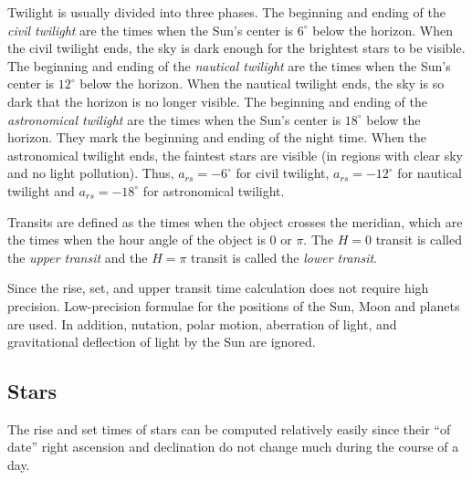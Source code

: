 \documentclass[12pt]{article}
\begin{document}
Twilight is usually divided into three phases. The beginning and ending 
of the {\em civil twilight} are the times when the Sun's center is $6^\circ$ below 
the horizon. When the civil twilight ends, the sky is dark enough for the 
brightest stars to be visible. The beginning and ending of the {\em nautical 
twilight} are the times when the Sun's center is $12^\circ$ below the horizon. When the 
nautical twilight ends, the sky is so dark that the horizon is no longer visible. 
The beginning and ending of the {\em astronomical twilight} are the times when 
the Sun's center is $18^\circ$ below the horizon. They mark the beginning and ending 
of the night time. When the astronomical twilight ends, the faintest stars 
are visible (in regions with clear sky and no light pollution). Thus, $a_{rs}=-6^\circ$ 
for civil twilight, $a_{rs}=-12^\circ$ for nautical twilight and 
$a_{rs}=-18^\circ$ for astronomical twilight.

Transits are defined as the times when the object crosses the meridian, which are 
the times when the hour angle of the object is 0 or $\pi$. The $H=0$ transit 
is called the {\em upper transit} and the $H=\pi$ transit is called the 
{\em lower transit}. 

Since the rise, set, and upper transit time calculation does not require high 
precision. Low-precision formulae for the positions of the Sun, Moon and planets 
are used. In addition, nutation, polar motion, aberration of light, and gravitational 
deflection of light by the Sun are ignored.

\subsection{Stars}

The rise and set times of stars can be computed relatively easily since their 
``of date'' right ascension and declination do not change much during the 
course of a day.
\end{document}
